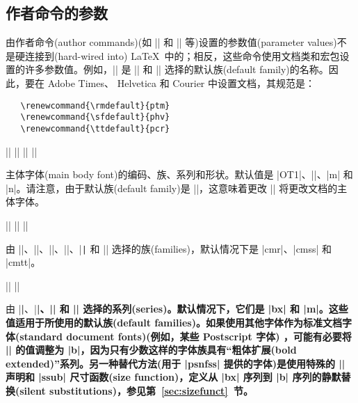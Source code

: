 \documentclass{ltxguide}[1995/11/28]
\newcommand{\heiti}{\CJKfamily{heiti}} %
\begin{document}
\subsection[作者命令的参数]{\heiti 作者命令的参数}
\label{Sec:text.param}

由作者命令(author commands)(如 |\textrm| 和 |\rmfamily| 等)设置的参数值(parameter values)不是硬连接到(hard-wired into) \LaTeX\ 中的；相反，这些命令使用文档类和宏包设置的许多参数值。例如，|\rmdefault| 是 |\textrm| 和 |\rmfamily| 选择的默认族(default family)的名称。因此，要在 Adobe Times、 Helvetica 和 Courier 中设置文档，其规范是：
\begin{verbatim}
   \renewcommand{\rmdefault}{ptm}
   \renewcommand{\sfdefault}{phv}
   \renewcommand{\ttdefault}{pcr}
\end{verbatim}

\begin{decl}
  |\encodingdefault| \qquad
  |\familydefault|   \qquad
  |\seriesdefault|   \qquad
  |\shapedefault|
\end{decl}
主体字体(main body font)的编码、族、系列和形状。默认值是 |OT1|、|\rmdefault|、|m| 和 |n|。请注意，由于默认族(default family)是 |\rmdefault|，这意味着更改 |\rmdefault| 将更改文档的主体字体。

\begin{decl}
  |\rmdefault| \qquad
  |\sfdefault| \qquad
  |\ttdefault|
\end{decl}
由 |\textrm|、|\rmfamily|、|\textsf|、|\sffamily|、|\texttt| 和 |\ttfamily| 选择的族(families)，默认情况下是 |cmr|、|cmss| 和 |cmtt|。

\begin{decl}
  |\bfdefault| \qquad
  |\mddefault|
\end{decl}
由 |\textbf|、|\bfseries|、|\textmd| 和 |\mdseries| 选择的系列(series)。默认情况下，它们是 |bx| 和 |m|。这些值适用于所使用的默认族(default families)。如果使用其他字体作为标准文档字体(standard document fonts)(例如，某些 Postscript 字体) ，可能有必要将 |\bfdefault| 的值调整为 |b|，因为只有少数这样的字体族具有“粗体扩展(bold extended)”系列。另一种替代方法(用于 |psnfss| 提供的字体)是使用特殊的  |\DeclareFontShape| 声明和 |ssub| 尺寸函数(size function)，定义从 |bx| 序列到 |b| 序列的静默替换(silent substitutions)，参见第~\ref{sec:sizefunct}~节。
\end{document}
